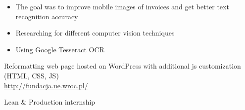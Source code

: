 \documentclass[10pt,a4paper,ragged2e,withhyper, normalphoto]{altacv}
\begin{document}
\begin{paracol}{2}
\begin{itemize}
        \begin{itemize}
            \item The goal was to improve mobile images of invoices and get better text recognition accuracy 
            \item Researching for different computer vision techniques
            \item Using Google Tesseract OCR
        \end{itemize}
    \end{itemize}
    
    \divider

    
    Reformatting web page hosted on WordPress with additional js customization (HTML, CSS, JS) \\ \url{http://fundacja.ue.wroc.pl/}
    
    \divider
    
    Lean \& Production internship 
    

\end{paracol}
\end{document}
